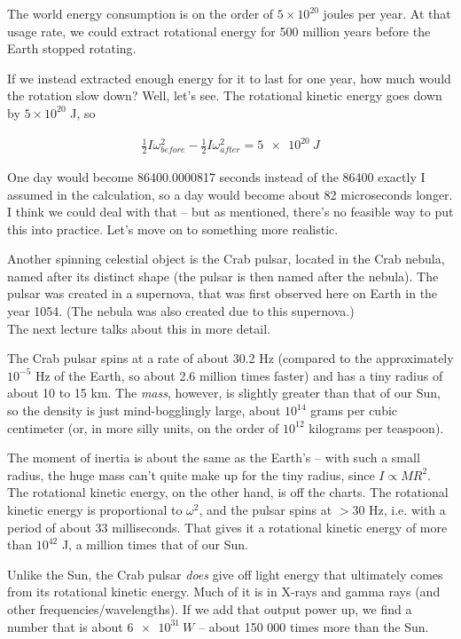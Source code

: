 The world energy consumption is on the order of $5 \times 10^{20}$ joules per year. At that usage rate, we could extract rotational energy for 500 million years before the Earth stopped rotating.

If we instead extracted enough energy for it to last for one year, how much would the rotation slow down? Well, let's see. The rotational kinetic energy goes down by $5 \times 10^{20}$ J, so

\begin{align}
\frac{1}{2} I \omega_{before}^2 - \frac{1}{2} I \omega_{after}^2 = \SI{5e20}{J}
\end{align}

One day would become 86400.0000817 seconds instead of the 86400 exactly I assumed in the calculation, so a day would become about 82 microseconds longer. I think we could deal with that -- but as mentioned, there's no feasible way to put this into practice. Let's move on to something more realistic.

Another spinning celestial object is the Crab pulsar, located in the Crab nebula, named after its distinct shape (the pulsar is then named after the nebula). The pulsar was created in a supernova, that was first observed here on Earth in the year 1054. (The nebula was also created due to this supernova.)\\
The next lecture talks about this in more detail.

The Crab pulsar spins at a rate of about 30.2 Hz (compared to the approximately $10^{-5}$ Hz of the Earth, so about 2.6 million times faster) and has a tiny radius of about 10 to 15 km. The \emph{mass}, however, is slightly greater than that of our Sun, so the density is just mind-bogglingly large, about $10^{14}$ grams per cubic centimeter (or, in more silly units, on the order of $10^{12}$ kilograms per teaspoon).

The moment of inertia is about the same as the Earth's -- with such a small radius, the huge mass can't quite make up for the tiny radius, since $I \propto M R^2$.\\
The rotational kinetic energy, on the other hand, is off the charts. The rotational kinetic energy is proportional to $\omega^2$, and the pulsar spins at $>30$ Hz, i.e. with a period of about 33 milliseconds. That gives it a rotational kinetic energy of more than $10^{42}$ J, a million times that of our Sun.

Unlike the Sun, the Crab pulsar \emph{does} give off light energy that ultimately comes from its rotational kinetic energy. Much of it is in X-rays and gamma rays (and other frequencies/wavelengths). If we add that output power up, we find a number that is about $\SI{6e31}{W}$ -- about 150 000 times more than the Sun.

